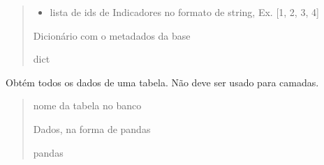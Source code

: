 \documentclass[letterpaper,10pt,brazil]{sphinxmanual}
\begin{document}
\begin{fulllineitems}
\begin{fulllineitems}
\begin{quote}
\begin{description}
\begin{itemize}
\item {} 
\sphinxAtStartPar
{} \textendash{} lista de ids de Indicadores no formato de string, Ex. {[}1, 2, 3, 4{]}

\end{itemize}

\sphinxAtStartPar
Dicionário com o metadados da base

\sphinxAtStartPar
dict

\end{description}\end{quote}

\end{fulllineitems}


\begin{fulllineitems}
\label{\detokenize{api_gen/apiModulo.api_consulta:apiModulo.api_consulta.ApiConsulta.obterTabela}}
\pysigstartsignatures
{}
\pysigstopsignatures
\sphinxAtStartPar
Obtém todos os dados de uma tabela. 
Não deve ser usado para camadas.
\begin{quote}\begin{description}
\sphinxAtStartPar
{} \textendash{} nome da tabela no banco

\sphinxAtStartPar
Dados, na forma de pandas

\sphinxAtStartPar
pandas

\end{description}\end{quote}

\end{fulllineitems}



\end{fulllineitems}
\end{document}
